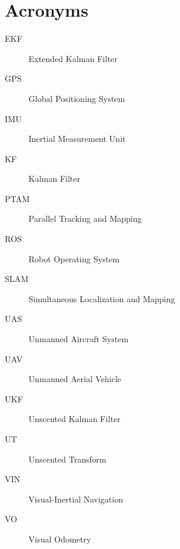 \chapter*{Acronyms}

\begin{description}
\item [EKF] Extended Kalman Filter
\item [GPS] Global Positioning System
\item [IMU] Inertial Measurement Unit
\item [KF] Kalman Filter
\item [PTAM] Parallel Tracking and Mapping
\item [ROS] Robot Operating System
\item [SLAM] Simultaneous Localization and Mapping
\item [UAS] Unmanned Aircraft System
\item [UAV] Unmanned Aerial Vehicle
\item [UKF] Unscented Kalman Filter
\item [UT] Unscented Transform
\item [VIN] Visual-Inertial Navigation
\item [VO] Visual Odometry
\end{description}